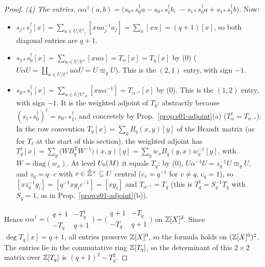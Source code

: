 \begin{proof}
\emph{(4) The entries.} $\alpha\alpha^\dagger(a,b)=\big(s_{0*}s_0^\dagger a-s_{0*}s_1^\dagger b,\ -s_{1*}s_0^\dagger a+s_{1*}s_1^\dagger b\big)$. Now:
\begin{itemize}
\item $s_{j*}s_j^\dagger[x]=\sum_{u\in U/U'_j}[xua_j^{-1}a_j]=\sum_u[xu]=(q+1)[x]$, so both diagonal entries are $q+1$.
\item $s_{1*}s_0^\dagger[x]=\sum_{u\in U/U'}[xu\alpha]=T_\alpha[x]=T_q[x]$ by (0) ($U\alpha U=\coprod_{u\in U/U'}u\alpha U=U\varpi_qU$). This is the $(2,1)$ entry, with sign $-1$.
\item $s_{0*}s_1^\dagger[x]=\sum_{u\in U/U'_\alpha}[xu\alpha^{-1}]=T_{\alpha^{-1}}[x]$ by (0). This is the $(1,2)$ entry, with sign $-1$. It is the weighted adjoint of
  $T_q$: abstractly because $(s_{1*}s_0^\dagger)^\dagger=s_{0*}s_1^\dagger$, and concretely by Prop.~\ref{prop:s01-adjoint}(a) ($T_\alpha^\dagger=T_{\alpha^{-1}}$). In the
  row convention $T_q[x]=\sum_yB_q(x,y)[y]$ of the Brandt matrix (as for $T_\ell$ at the start of this section), the weighted adjoint has
  $T_q^\dagger[x]=\sum_y\big(WB_q^{\mathsf T}W^{-1}\big)(x,y)[y]=\sum_y w_xB_q(y,x)w_y^{-1}[y]$, with $W=\mathrm{diag}(w_x)$. At level $U_0(M)$ it equals $T_q$: by (0),
  $U\alpha^{-1}U=z_q^{-1}U\varpi_qU$, and $z_q=q\cdot c$ with $c\in\hat{\mathbb{Z}}^\times\subseteq U$ central ($c_v=q^{-1}$ for $v\ne q$, $c_q=1$), so
  $[xz_q^{-1}g_i]=[q^{-1}xg_ic^{-1}]=[xg_i]$ and $T_{\alpha^{-1}}=T_q$ (this is $T_q^\dagger=S_q^{-1}T_q$ with $S_q=1$, as in Prop.~\ref{prop:s01-adjoint}(b)).
\end{itemize}
Hence $\alpha\alpha^\dagger=\big(\begin{smallmatrix}q+1&-T_q^\dagger\\-T_q&q+1\end{smallmatrix}\big)=\big(\begin{smallmatrix}q+1&-T_q\\-T_q&q+1\end{smallmatrix}\big)$ on
$\mathbb{Z}[X]^2$. Since $\deg T_q[x]=q+1$, all entries preserve $\mathbb{Z}[X]^0$, so the formula holds on $(\mathbb{Z}[X]^0)^2$. The entries lie in the commutative ring $\mathbb{Z}[T_q]$, so
the determinant of this $2\times2$ matrix over $\mathbb{Z}[T_q]$ is $(q+1)^2-T_q^2$.
\end{proof}

